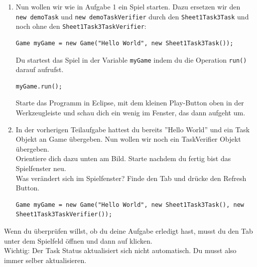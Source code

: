 
\label{ex3}

\begin{enumerate}
    \item Nun wollen wir wie in Aufgabe 1 ein Spiel starten. Dazu ersetzen wir den \lstinline{ new demoTask} und \lstinline{new demoTaskVerifier} durch 
        den \lstinline{Sheet1Task3Task} und noch ohne den \lstinline{Sheet1Task3TaskVerifier}:

    \begin{lstlisting}
Game myGame = new Game("Hello World", new Sheet1Task3Task());
    \end{lstlisting}

    Du startest das Spiel in der Variable \lstinline{myGame} indem du die Operation \lstinline{run()} darauf aufrufst.

    \begin{lstlisting}
myGame.run();
    \end{lstlisting}

    Starte das Programm in Eclipse, mit dem kleinen Play-Button oben in der Werkzeugleiste und schau dich ein wenig im Fenster, das dann aufgeht um.

    \vspace{5mm}

    \item In der vorherigen Teilaufgabe hattest du bereits ''Hello World'' und ein Task Objekt an Game übergeben.
        Nun wollen wir noch ein TaskVerifier Objekt übergeben.\\
        Orientiere dich dazu unten am Bild. Starte nachdem du fertig bist das Spielfenster neu. \\

        Was verändert sich im Spielfenster?
        Finde den  Tab und drücke den Refresh Button.

    \begin{lstlisting}
Game myGame = new Game("Hello World", new Sheet1Task3Task(), new Sheet1Task3TaskVerifier());
    \end{lstlisting}

\end{enumerate}


\begin{Infobox}
    Wenn du überprüfen willst, ob du deine Aufgabe erledigt hast, musst du den  Tab unter dem Spielfeld öffnen und dann auf  klicken.\\

    Wichtig: Der Task Status aktualisiert sich nicht automatisch. Du musst also immer selber aktualisieren.
\end{Infobox}


